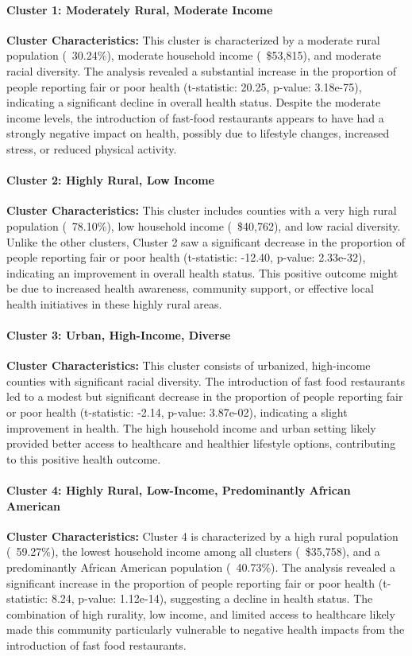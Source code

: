 \documentclass[letterpaper, 11pt]{report}
\begin{document}
\paragraph{Cluster 1: Moderately Rural, Moderate Income}
\textbf{Cluster Characteristics:} This cluster is characterized by a moderate rural population (~30.24\%), moderate household income (~\$53,815), and moderate racial diversity. The analysis revealed a substantial increase in the proportion of people reporting fair or poor health (t-statistic: 20.25, p-value: 3.18e-75), indicating a significant decline in overall health status. Despite the moderate income levels, the introduction of fast-food restaurants appears to have had a strongly negative impact on health, possibly due to lifestyle changes, increased stress, or reduced physical activity.

\paragraph{Cluster 2: Highly Rural, Low Income}
\textbf{Cluster Characteristics:} This cluster includes counties with a very high rural population (~78.10\%), low household income (~\$40,762), and low racial diversity. Unlike the other clusters, Cluster 2 saw a significant decrease in the proportion of people reporting fair or poor health (t-statistic: -12.40, p-value: 2.33e-32), indicating an improvement in overall health status. This positive outcome might be due to increased health awareness, community support, or effective local health initiatives in these highly rural areas.

\paragraph{Cluster 3: Urban, High-Income, Diverse}
\textbf{Cluster Characteristics:} This cluster consists of urbanized, high-income counties with significant racial diversity. The introduction of fast food restaurants led to a modest but significant decrease in the proportion of people reporting fair or poor health (t-statistic: -2.14, p-value: 3.87e-02), indicating a slight improvement in health. The high household income and urban setting likely provided better access to healthcare and healthier lifestyle options, contributing to this positive health outcome.

\paragraph{Cluster 4: Highly Rural, Low-Income, Predominantly African American}
\textbf{Cluster Characteristics:} Cluster 4 is characterized by a high rural population (~59.27\%), the lowest household income among all clusters (~\$35,758), and a predominantly African American population (~40.73\%). The analysis revealed a significant increase in the proportion of people reporting fair or poor health (t-statistic: 8.24, p-value: 1.12e-14), suggesting a decline in health status. The combination of high rurality, low income, and limited access to healthcare likely made this community particularly vulnerable to negative health impacts from the introduction of fast food restaurants.
\end{document}
